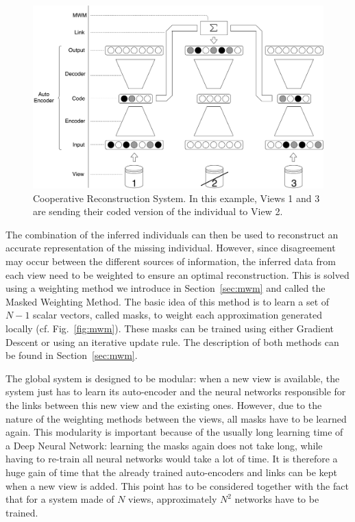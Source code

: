 	\begin{figure}[h]
		\centering
		\includegraphics[width=\textwidth]{img/base_system.pdf}
        \caption{Cooperative Reconstruction System. In this example, Views 1 and
        3 are sending their coded version of the individual to View 2.}
\label{fig:base}
	\end{figure}
	
    The combination of the inferred individuals can then be used to reconstruct an accurate representation of the missing individual. However, since disagreement may occur between the different sources of information, the inferred data from each view need to be weighted to ensure an optimal reconstruction. This is solved using a weighting method we introduce in Section~\ref{sec:mwm} and called the Masked Weighting Method. The basic idea of this method is to learn a set of $N-1$ scalar vectors, called masks, to weight each approximation generated locally (cf. Fig.~\ref{fig:mwm}). These masks can be trained using either Gradient Descent or using an iterative update rule. The description of both methods can be found in Section~\ref{sec:mwm}.
	
	
The global system is designed to be modular: when a new view is available, the system just has to learn its auto-encoder and the neural networks responsible for the links between this new view and the existing ones. However, due to the nature of the weighting methods between the views, all masks have to be learned again.  This modularity is important because of the usually long learning time of a Deep Neural Network: learning the masks again does not take long, while having to re-train all neural networks would take a lot of time. It is therefore a huge gain of time that the already trained auto-encoders and links can be kept when a new view is added. This point has to be considered together with the fact that for a system made of $N$ views, approximately $N^2$ networks have to be trained.
	
